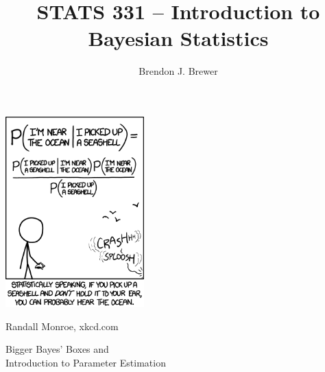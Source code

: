 \documentclass{beamer}
\author{Brendon J. Brewer}
\title{STATS 331 -- Introduction to Bayesian Statistics}
\institute{The University of Auckland}
\date{}
\begin{document}
\frame{\titlepage}

\begin{frame}
\begin{center}
\includegraphics[width=0.4\textwidth]{images/seashell.png}
\end{center}

Randall Monroe, xkcd.com

\end{frame}


\begin{frame}

\begin{center}
\Large
Bigger Bayes' Boxes and \\
Introduction to Parameter Estimation
\end{center}

\end{frame}
\end{document}
